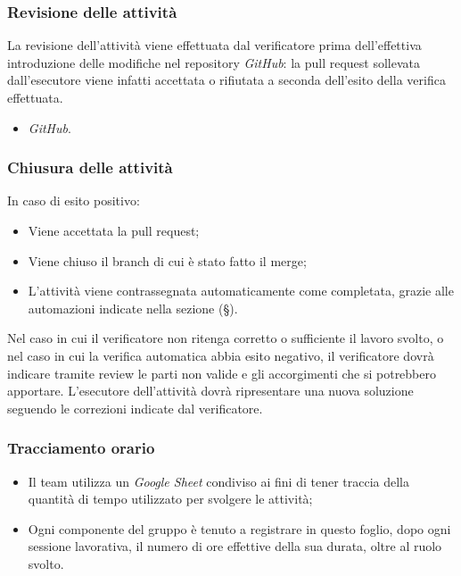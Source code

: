 \documentclass[10pt, a4paper]{article}
\begin{document}
\subsubsection{Revisione delle attività}
La revisione dell'attività viene effettuata dal verificatore prima dell'effettiva introduzione delle modifiche nel repository \textit{GitHub}: la pull request sollevata dall'esecutore viene infatti accettata o rifiutata a seconda dell'esito della verifica effettuata.
\begin{itemize}
    \item \textit{GitHub}.
\end{itemize}
\subsubsection{Chiusura delle attività}
In caso di esito positivo:
\begin{itemize}
    \item Viene accettata la pull request;
    \item Viene chiuso il branch di cui è stato fatto il merge;
    \item L'attività viene contrassegnata automaticamente come completata, grazie alle automazioni indicate nella sezione 
    (\S {}).
\end{itemize}
Nel caso in cui il verificatore non ritenga corretto o sufficiente il lavoro svolto, o nel caso in cui la verifica automatica abbia esito negativo, il verificatore dovrà indicare tramite review le parti non valide e gli accorgimenti che si potrebbero apportare.
L'esecutore dell'attività dovrà ripresentare una nuova soluzione seguendo le correzioni indicate dal verificatore.

\subsubsection{Tracciamento orario}
\begin{itemize}
    \item Il team utilizza un \textit{Google Sheet} condiviso ai fini di tener traccia della quantità di tempo utilizzato per svolgere le attività;
    \item Ogni componente del gruppo è tenuto a registrare in questo foglio, dopo ogni sessione lavorativa, il numero di ore effettive della sua durata, oltre al 
    ruolo svolto.
\end{itemize}
 
\end{document}

